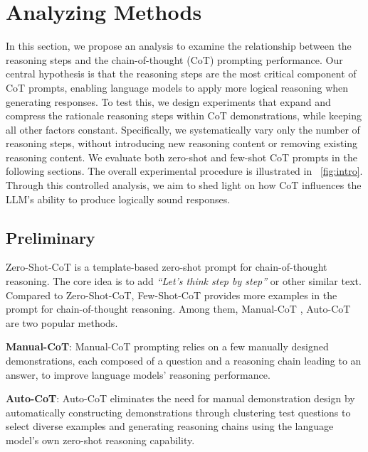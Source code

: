\section{Analyzing Methods}\label{sec:methods}
In this section, we propose an analysis to examine the relationship between the reasoning steps and the chain-of-thought (CoT) prompting performance. Our central hypothesis is that the reasoning steps are the most critical component of CoT prompts, enabling language models to apply more logical reasoning when generating responses.
To test this, we design experiments that expand and compress the rationale reasoning steps within CoT demonstrations, while keeping all other factors constant. Specifically, we systematically vary only the number of reasoning steps, without introducing new reasoning content or removing existing reasoning content. We evaluate both zero-shot and few-shot CoT prompts in the following sections. The overall experimental procedure is illustrated in ~\autoref{fig:intro}. Through this controlled analysis, we aim to shed light on how CoT influences the LLM's ability to produce logically sound responses.

\subsection{Preliminary}
Zero-Shot-CoT \cite{kojima2023large} is a template-based zero-shot prompt for chain-of-thought reasoning. The core idea is to add \textit{``Let's think step by step''} or other similar text. Compared to Zero-Shot-CoT, Few-Shot-CoT provides more examples in the prompt for chain-of-thought reasoning. Among them, Manual-CoT \cite{wei2022chain}, Auto-CoT \cite{zhang2022automatic} are two popular methods.

\noindent
\textbf{Manual-CoT}: Manual-CoT prompting relies on a few manually designed demonstrations, each composed of a question and a reasoning chain leading to an answer, to improve language models' reasoning performance.

\noindent
\textbf{Auto-CoT}: Auto-CoT eliminates the need for manual demonstration design by automatically constructing demonstrations through clustering test questions to select diverse examples and generating reasoning chains using the language model's own zero-shot reasoning capability.

